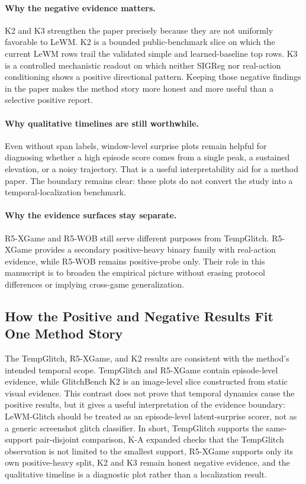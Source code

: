 \paragraph{Why the negative evidence matters.}
K2 and K3 strengthen the paper precisely because they are not uniformly favorable to LeWM. K2 is a
bounded public-benchmark slice on which the current LeWM rows trail the validated simple and
learned-baseline top rows. K3 is a controlled mechanistic readout on which neither SIGReg nor
real-action conditioning shows a positive directional pattern. Keeping those negative findings in
the paper makes the method story more honest and more useful than a selective positive report.

\paragraph{Why qualitative timelines are still worthwhile.}
Even without span labels, window-level surprise plots remain helpful for diagnosing whether a high
episode score comes from a single peak, a sustained elevation, or a noisy trajectory. That is a
useful interpretability aid for a method paper. The boundary remains clear: these plots do not
convert the study into a temporal-localization benchmark.

\paragraph{Why the evidence surfaces stay separate.}
R5-XGame and R5-WOB still serve different purposes from TempGlitch. R5-XGame provides a secondary
positive-heavy binary family with real-action evidence, while R5-WOB remains positive-probe only.
Their role in this manuscript is to broaden the empirical picture without erasing protocol
differences or implying cross-game generalization.

\subsection{How the Positive and Negative Results Fit One Method Story}

The TempGlitch, R5-XGame, and K2 results are consistent with the method's intended temporal
scope. TempGlitch and R5-XGame contain episode-level evidence, while GlitchBench K2 is an
image-level slice constructed from static visual evidence. This contrast does not prove that
temporal dynamics cause the positive results, but it gives a useful interpretation of the
evidence boundary: LeWM-Glitch should be treated as an episode-level latent-surprise scorer, not
as a generic screenshot glitch classifier.
In short, TempGlitch supports the same-support pair-disjoint comparison, K-A expanded checks that
the TempGlitch observation is not limited to the smallest support, R5-XGame supports only its own
positive-heavy split, K2 and K3 remain honest negative evidence, and the qualitative timeline is a
diagnostic plot rather than a localization result.
